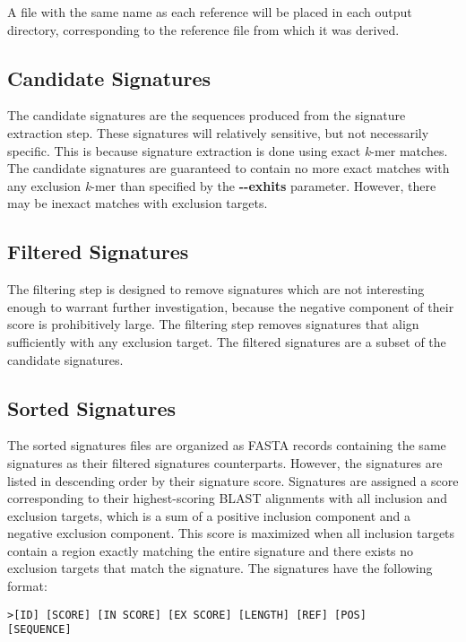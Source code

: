 \documentclass[a4paper,10pt]{article}
\begin{document}
A file with the same name as each reference will be placed in each output directory, corresponding to the reference file from which it was derived.

\subsection{Candidate Signatures}

The candidate signatures are the sequences produced from the signature extraction step. These signatures will relatively sensitive, but not necessarily specific. This is because signature extraction is done using exact \textit{k}-mer matches. The candidate signatures are guaranteed to contain no more exact matches with any exclusion \textit{k}-mer than specified by the \mbox{\textbf{-{}-exhits}} parameter. However, there may be inexact matches with exclusion targets. 

\subsection{Filtered Signatures}

The filtering step is designed to remove signatures which are not interesting enough to warrant further investigation, because the negative component of their score is prohibitively large. The filtering step removes signatures that align sufficiently with any exclusion target. The filtered signatures are a subset of the candidate signatures.

\subsection{Sorted Signatures}

The sorted signatures files are organized as FASTA records containing the same signatures as their filtered signatures counterparts. However, the signatures are listed in descending order by their signature score. Signatures are assigned a score corresponding to their highest-scoring BLAST alignments with all inclusion and exclusion targets, which is a sum of a positive inclusion component and a negative exclusion component. This score is maximized when all inclusion targets contain a region exactly matching the entire signature and there exists no exclusion targets that match the signature. The signatures have the following format:

\begin{verbatim}
>[ID] [SCORE] [IN SCORE] [EX SCORE] [LENGTH] [REF] [POS]
[SEQUENCE]
\end{verbatim}
\end{document}

